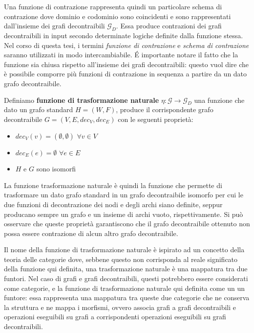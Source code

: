 Una funzione di contrazione rappresenta quindi un particolare schema di contrazione dove dominio e codominio sono
coincidenti e sono rappresentati dall'insieme dei grafi decontraibili $\mathcal{G}_D$. Essa produce contrazioni
dei grafi decontraibili in input secondo determinate logiche definite dalla funzione stessa.
Nel corso di questa tesi, i termini \textit{funzione di contrazione} e \textit{schema di contrazione}
saranno utilizzati in modo intercambiabile. \newline
\'E importante notare il fatto che la funzione sia chiusa rispetto all'insieme dei grafi decontraibili: questo vuol
dire che \`e possibile comporre pi\`u funzioni di contrazione in sequenza a partire da un dato grafo decontraibile.
\newline

\begin{definition} 
Definiamo \textbf{funzione di trasformazione naturale} $\eta : \mathcal{G} \rightarrow \mathcal{G}_D$ una funzione che
dato un grafo standard $H = (W, F)$, produce il corrispondente grafo decontraibile $G = (V, E, dec_V, dec_E)$ con le
seguenti propriet\`a:
    \begin{itemize}
        \item $dec_V(v) = (\emptyset, \emptyset)$ \quad $\forall v\in V$
        \item $dec_E(e) = \emptyset$ \quad $\forall e\in E$
        \item $H$ e $G$ sono isomorfi
    \end{itemize}
\end{definition}

La funzione trasformazione naturale \`e quindi la funzione che permette di trasformare un dato grafo standard in un
grafo decontraibile isomorfo per cui le due funzioni di decontrazione dei nodi e degli archi siano definite,
seppur producano sempre un grafo e un insieme di archi vuoto, rispettivamente. \newline
Si pu\`o osservare che queste propriet\`a garantiscono che il grafo decontraibile ottenuto non possa essere
contrazione di alcun altro grafo decontraibile. \newline

Il nome della funzione di trasformazione naturale è ispirato ad un concetto della teoria delle categorie dove,
sebbene questo non corrisponda al reale significato della funzione qui definita, una trasformazione naturale è una
mappatura tra due funtori.
Nel caso di grafi e grafi decontraibili, questi potrebbero essere considerati come categorie, e la funzione di
trasformazione naturale qui definita come un un funtore: essa rappresenta una mappatura tra queste due categorie
che ne conserva la struttura e ne mappa i morfismi, ovvero associa grafi a grafi decontraibili e operazioni eseguibili
su grafi a corrispondenti operazioni eseguibili su grafi decontraibili.

